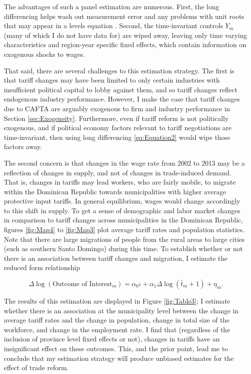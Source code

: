 The advantages of such a panel estimation are numerous. First, the long differencing helps 
wash out measurement error and any problems with unit roots that may appear in a levels equation 
\citep{amiti2012trade}.
Second, the time-invariant controls $Y_m$ (many of which I do not have data for) are wiped away,
leaving only time varying characteristics and region-year specific fixed effects, which contain
information on exogenous shocks to wages.

That said, there are several challenges to this estimation strategy. The first is that 
tariff changes may have been limited to only certain industries with insufficient political
capital to lobby against them, and so tariff changes reflect endogenous industry performance.
However, I make the case that tariff changes due to CAFTA are arguably exogenous to 
firm and industry performance in Section \ref{sec:Exogeneity}. Furthermore, even if tariff
reform is not politically exogenous, and if political 
economy factors relevant to tariff negotiations are time-invariant, then using long differencing
\ref{eq:Equation2} would wipe those factors away.

The second concern is that changes in the wage rate from 2002 to 2013 may be a reflection of changes 
in supply, and not of changes in trade-induced demand. That is, changes in tariffs may lead workers,
who are fairly mobile, to migrate within the Dominican Republic towards municipalities with higher 
average protective input tariffs. In general equilibrium, wages would change accordingly to this shift 
in supply. To get a sense of demographic and labor market changes in comparison to tariff changes across
municipalities in the Dominican Republic, figures \ref{fig:Map4} to \ref{fig:Map3} plot average
tariff rates and population statistics. Note that there are large migrations of people from the rural
areas to large cities (such as southern Santo Domingo) during this time. 
To establish whether or not there is an association between tariff changes and migration,
I estimate the reduced form relationship

\begin{equation}
\label{eq:Equation3}
\Delta\log(\text{Outcome of Interest}_m) = \alpha_0 \iota + \alpha_1 \Delta\log(\bar{t}_{m}+1)+\eta_m.
\end{equation}

The results of this estimation are displayed in Figure \ref{fig:Table3}; I estimate whether there
is an association at the municipality level between the change in average tariff rates and the change in 
population, change in total size of the workforce, and change in the employment rate. I find that
(regardless of the inclusion of province level fixed effects or not), changes in tariffs have an
insignificant effect on these outcomes. This, and the prior point, lead me to conclude that my 
estimation strategy will produce unbiased estimates for the effect of trade reform.

